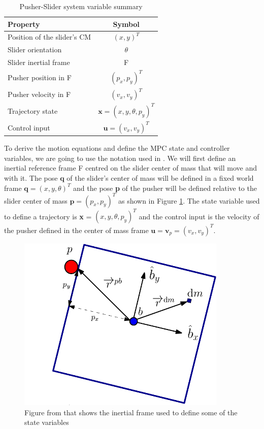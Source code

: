 \documentclass[12,twoside]{TFG-GM}
\theoremstyle{definition}
\theoremstyle{remark}
\begin{document}
\begin{table}[H]
\begin{center}
  \begin{tabular}{| l c |}
    \hline
    Property & Symbol \\ \hline
    Position of the slider's CM & $(x, y)^T$ \\
    Slider orientation & $\theta$ \\
    Slider inertial frame & F \\
    Pusher position in F & $(p_x, p_y)^T$ \\
    Pusher velocity in F & $(v_x, v_y)^T$ \\
    Trajectory state & $\textbf{x} = (x, y, \theta, p_y)^T$ \\
    Control input & $\textbf{u} = (v_x, v_y)^T$ \\
    \hline
  \end{tabular}
  \caption {Pusher-Slider system variable summary}
\end{center}
\end{table}


To derive the motion equations and define the MPC state and controller variables, we are going to use the notation used in \cite{fom}. We will first define an inertial reference frame F centred on the slider center of mass that will move and with it. The pose $\textbf{q}$ of the slider's center of mass  will be defined in a fixed world frame $\textbf{q} = (x, y, \theta)^T$ and the pose \textbf{p} of the pusher will be defined relative to the slider center of mass $\textbf{p} = (p_x, p_y)^T$ as shown in Figure \ref{fig:inertial_frame}. The state variable used to define a trajectory is \textbf{x} = $(x, y, \theta, p_y)^T$ and the control input is the velocity of the pusher defined in the center of mass frame $\textbf{u} = \textbf{v}_p = (v_x, v_y)^T$.

\begin{figure}[htb!]
\begin{center}
\includegraphics[width=10cm]{inertial_frame.png}
\end{center}
\caption[test caption]{\label{fig:inertial_frame} \small{Figure from \protect\cite{fom} that shows the inertial frame used to define some of the state variables}}
\end{figure}
\end{document}
